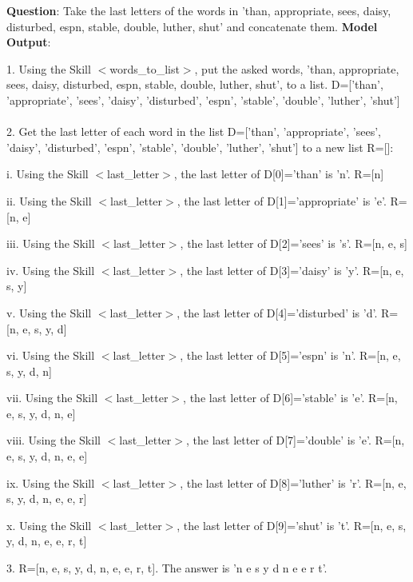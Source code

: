 \documentclass{article} %
\begin{document}
\begin{tcolorbox}[title = {Last Letter Concatenation}, colback = Apricot!25!white, colframe = BrickRed!75!black] 
\textbf{Question}: Take the last letters of the words in 'than, appropriate, sees, daisy, disturbed, espn, stable, double, luther, shut' and concatenate them.
\tcblower
\textbf{Model Output}:

\quad

1. Using the Skill $<$words\_to\_list$>$, put the asked words, 'than, appropriate, sees, daisy, disturbed, espn, stable, double, luther, shut', to a list.  D=['than', 'appropriate', 'sees', 'daisy', 'disturbed', 'espn', 'stable', 'double', 'luther', 'shut'] \\ \\
2. Get the last letter of each word in the list D=['than', 'appropriate', 'sees', 'daisy', 'disturbed', 'espn', 'stable', 'double', 'luther', 'shut'] to a new list R=[]: 

\quad

   \qquad i. Using the Skill $<$last\_letter$>$, the last letter of D[0]='than' is 'n'. R=[n] 
   
   \qquad ii. Using the Skill $<$last\_letter$>$, the last letter of D[1]='appropriate' is 'e'. R=[n, e] 
   
   \qquad iii. Using the Skill $<$last\_letter$>$, the last letter of D[2]='sees' is 's'. R=[n, e, s] 
   
   \qquad iv. Using the Skill $<$last\_letter$>$, the last letter of D[3]='daisy' is 'y'. R=[n, e, s, y] 
   
   \qquad v. Using the Skill $<$last\_letter$>$, the last letter of D[4]='disturbed' is 'd'. R=[n, e, s, y, d] 
   
   \qquad vi. Using the Skill $<$last\_letter$>$, the last letter of D[5]='espn' is 'n'. R=[n, e, s, y, d, n] 
   
   \qquad vii. Using the Skill $<$last\_letter$>$, the last letter of D[6]='stable' is 'e'. R=[n, e, s, y, d, n, e] 
   
   \qquad viii. Using the Skill $<$last\_letter$>$, the last letter of D[7]='double' is 'e'. R=[n, e, s, y, d, n, e, e] 
   
   \qquad ix. Using the Skill $<$last\_letter$>$, the last letter of D[8]='luther' is 'r'. R=[n, e, s, y, d, n, e, e, r] 
   
   \qquad x. Using the Skill $<$last\_letter$>$, the last letter of D[9]='shut' is 't'. R=[n, e, s, y, d, n, e, e, r, t] 

\quad

3. R=[n, e, s, y, d, n, e, e, r, t]. The answer is 'n e s y d n e e r t'. 
\end{tcolorbox}
\noindent\begin{minipage}{\textwidth}
 \label{Tab:example_last_letter_skill}
\end{minipage}
\end{document}
